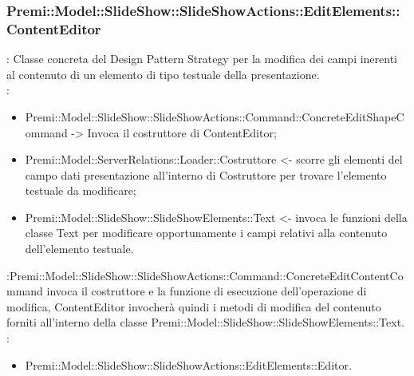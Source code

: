 {       \subsubsection{Premi::Model::SlideShow::SlideShowActions::EditElements::ContentEditor}{
				\textbf{\tipo}: Classe concreta del Design Pattern Strategy per la modifica dei campi inerenti al contenuto di un elemento di tipo testuale della presentazione.\\	
				\textbf{\relaz}: 
				\begin{itemize}
					\item Premi::Model::SlideShow::SlideShowActions::Command::ConcreteEditShapeCommand -> Invoca il costruttore di ContentEditor;
                    \item Premi::Model::ServerRelations::Loader::Costruttore <- scorre gli elementi del campo dati presentazione all'interno di Costruttore per trovare l'elemento testuale da modificare; 
                    \item Premi::Model::SlideShow::SlideShowElements::Text <- invoca le funzioni della classe Text per modificare opportunamente i campi relativi alla contenuto dell’elemento testuale.
				\end{itemize}	\textbf{\interfacce}:Premi::Model::SlideShow::SlideShowActions::Command::ConcreteEditContentCommand invoca il costruttore e la funzione di esecuzione dell’operazione di modifica, ContentEditor invocherà quindi i metodi di modifica del contenuto forniti all’interno della classe Premi::Model::SlideShow::SlideShowElements::Text.\\
                \textbf{\base}: 
                    \begin{itemize}
                    \item Premi::Model::SlideShow::SlideShowActions::EditElements::Editor.
                    \end{itemize}
                    }
}

